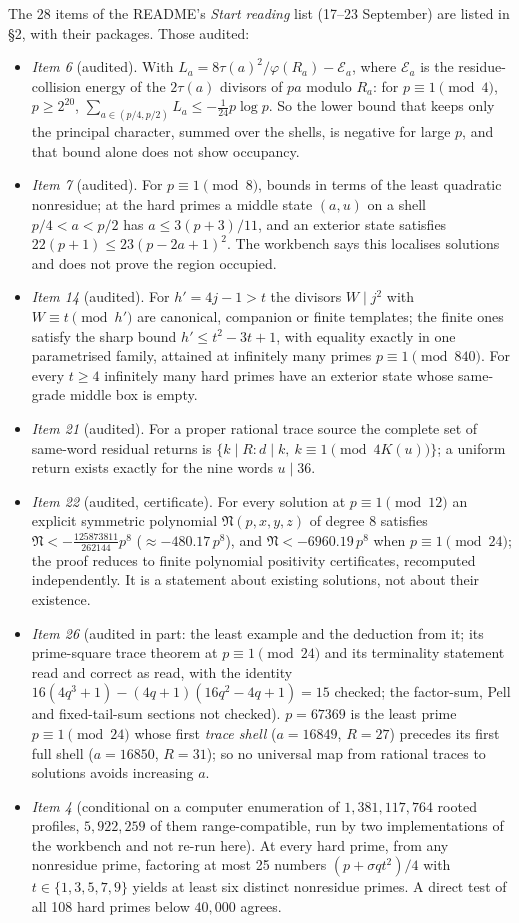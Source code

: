 The 28 items of the README's \emph{Start reading} list (17--23 September) are listed in  §2, with their packages. Those audited:
\begin{itemize}
\item \emph{Item 6} (audited). With $L_a=8\tau(a)^2/\varphi(R_a)-\mathcal E_a$, where $\mathcal E_a$ is the residue-collision energy of the $2\tau(a)$ divisors of $pa$ modulo $R_a$: for $p\equiv1\pmod4$, $p\ge2^{20}$, $\sum_{a\in(p/4,p/2)}L_a\le-\tfrac1{24}p\log p$. So the lower bound that keeps only the principal character, summed over the shells, is negative for large $p$, and that bound alone does not show occupancy.
\item \emph{Item 7} (audited). For $p\equiv1\pmod 8$, bounds in terms of the least quadratic nonresidue; at the hard primes a middle state $(a,u)$ on a shell $p/4<a<p/2$ has $a\le3(p+3)/11$, and an exterior state satisfies $22(p+1)\le23(p-2a+1)^2$. The workbench says this localises solutions and does not prove the region occupied.
\item \emph{Item 14} (audited). For $h'=4j-1>t$ the divisors $W\mid j^2$ with $W\equiv t\pmod{h'}$ are canonical, companion or finite templates; the finite ones satisfy the sharp bound $h'\le t^2-3t+1$, with equality exactly in one parametrised family, attained at infinitely many primes $p\equiv1\pmod{840}$. For every $t\ge4$ infinitely many hard primes have an exterior state whose same-grade middle box is empty.
\item \emph{Item 21} (audited). For a proper rational trace source the complete set of same-word residual returns is $\{k\mid R: d\mid k,\ k\equiv1\pmod{4K(u)}\}$; a uniform return exists exactly for the nine words $u\mid36$.
\item \emph{Item 22} (audited, certificate). For every solution at $p\equiv1\pmod{12}$ an explicit symmetric polynomial $\mathfrak N(p,x,y,z)$ of degree $8$ satisfies $\mathfrak N<-\frac{125873811}{262144}p^8$ ($\approx-480.17\,p^8$), and $\mathfrak N<-6960.19\,p^8$ when $p\equiv1\pmod{24}$; the proof reduces to finite polynomial positivity certificates, recomputed independently. It is a statement about existing solutions, not about their existence.
\item \emph{Item 26} (audited in part: the least example and the deduction from it; its prime-square trace theorem at $p\equiv1\pmod{24}$ and its terminality statement read and correct as read, with the identity $16(4q^3+1)-(4q+1)(16q^2-4q+1)=15$ checked; the factor-sum, Pell and fixed-tail-sum sections not checked). $p=67369$ is the least prime $p\equiv1\pmod{24}$ whose first \emph{trace shell} ($a=16849$, $R=27$) precedes its first full shell ($a=16850$, $R=31$); so no universal map from rational traces to solutions avoids increasing $a$.
\item \emph{Item 4} (conditional on a computer enumeration of $1{,}381{,}117{,}764$ rooted profiles, $5{,}922{,}259$ of them range-compatible, run by two implementations of the workbench and not re-run here). At every hard prime, from any nonresidue prime, factoring at most 25 numbers $(p+\sigma qt^2)/4$ with $t\in\{1,3,5,7,9\}$ yields at least six distinct nonresidue primes. A direct test of all 108 hard primes below $40{,}000$ agrees.
\end{itemize}
